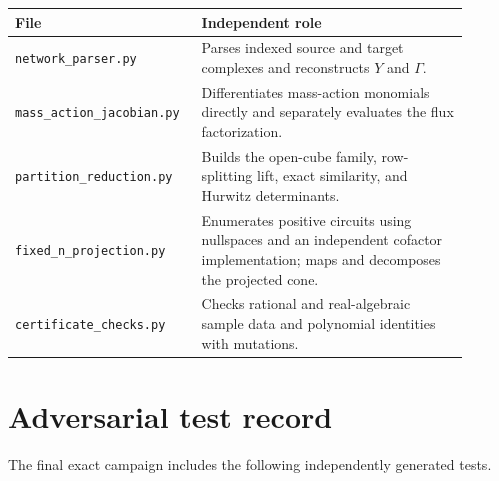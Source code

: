 \documentclass[11pt]{article}
\theoremstyle{definition}
\begin{document}
\begin{center}
\begin{tabular}{p{0.34\linewidth}p{0.56\linewidth}}
\toprule
File & Independent role\\
\midrule
\texttt{network\_parser.py} & Parses indexed source and target complexes and reconstructs $Y$ and $\Gamma$.\\
\texttt{mass\_action\_jacobian.py} & Differentiates mass-action monomials directly and separately evaluates the flux factorization.\\
\texttt{partition\_reduction.py} & Builds the open-cube family, row-splitting lift, exact similarity, and Hurwitz determinants.\\
\texttt{fixed\_n\_projection.py} & Enumerates positive circuits using nullspaces and an independent cofactor implementation; maps and decomposes the projected cone.\\
\texttt{certificate\_checks.py} & Checks rational and real-algebraic sample data and polynomial identities with mutations.\\
\bottomrule
\end{tabular}
\end{center}

\section{Adversarial test record}

The final exact campaign includes the following independently generated tests.
\end{document}
